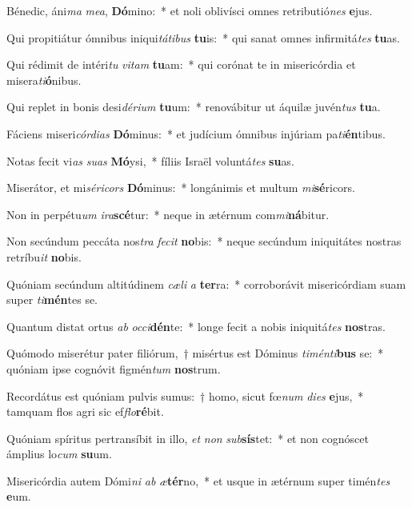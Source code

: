 \item Bénedic, áni\textit{ma} \textit{me}\textit{a}, \textbf{Dó}mino:~* et noli oblivísci omnes retributió\textit{nes} \textbf{e}jus.
\item Qui propitiátur ómnibus iniqui\textit{tá}\textit{ti}\textit{bus} \textbf{tu}is:~* qui sanat omnes infirmitá\textit{tes} \textbf{tu}as.
\item Qui rédimit de intéri\textit{tu} \textit{vi}\textit{tam} \textbf{tu}am:~* qui corónat te in misericórdia et misera\textit{ti}\textbf{ó}nibus.
\item Qui replet in bonis desi\textit{dé}\textit{ri}\textit{um} \textbf{tu}um:~* renovábitur ut áquilæ juvén\textit{tus} \textbf{tu}a.
\item Fáciens miseri\textit{cór}\textit{di}\textit{as} \textbf{Dó}minus:~* et judícium ómnibus injúriam pa\textit{ti}\textbf{én}tibus.
\item Notas fecit vi\textit{as} \textit{su}\textit{as} \textbf{Mó}ysi,~* fíliis Israël voluntá\textit{tes} \textbf{su}as.
\item Miserátor, et mi\textit{sé}\textit{ri}\textit{cors} \textbf{Dó}minus:~* longánimis et multum \textit{mi}\textbf{sé}ricors.
\item Non in perpétu\textit{um} \textit{i}\textit{ra}\textbf{scé}tur:~* neque in ætérnum com\textit{mi}\textbf{ná}bitur.
\item Non secúndum peccáta nos\textit{tra} \textit{fe}\textit{cit} \textbf{no}bis:~* neque secúndum iniquitátes nostras retríbu\textit{it} \textbf{no}bis.
\item Quóniam secúndum altitúdinem \textit{cæ}\textit{li} \textit{a} \textbf{ter}ra:~* corroborávit misericórdiam suam super \textit{ti}\textbf{mén}tes se.
\item Quantum distat ortus \textit{ab} \textit{oc}\textit{ci}\textbf{dén}te:~* longe fecit a nobis iniquitá\textit{tes} \textbf{nos}tras.
\item Quómodo miserétur pater filiórum,~† misértus est Dóminus \textit{ti}\textit{mén}\textit{ti}\textbf{bus} se:~* quóniam ipse cognóvit figmén\textit{tum} \textbf{nos}trum.
\item Recordátus est quóniam pulvis sumus:~† homo, sicut fœ\textit{num} \textit{di}\textit{es} \textbf{e}jus,~* tamquam flos agri sic ef\textit{flo}\textbf{ré}bit.
\item Quóniam spíritus pertransíbit in illo, \textit{et} \textit{non} \textit{sub}\textbf{sís}tet:~* et non cognóscet ámplius lo\textit{cum} \textbf{su}um.
\item Misericórdia autem Dómi\textit{ni} \textit{ab} \textit{æ}\textbf{tér}no,~* et usque in ætérnum super timén\textit{tes} \textbf{e}um.
